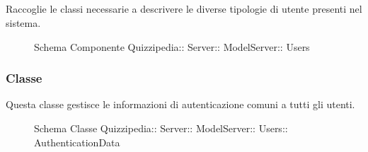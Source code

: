 \subsection{}
Raccoglie le classi necessarie a descrivere le diverse tipologie di utente presenti nel sistema.
\begin{figure}[H]
\centering
\noindent{}
\caption[Schema Componente Quizzipedia::Server::ModelServer::Users]{Schema Componente Quizzipedia:: Server:: ModelServer:: Users}
\end{figure}
\subsubsection{Classe }
Questa classe gestisce le informazioni di autenticazione comuni a tutti gli utenti.
\begin{figure}[H]
\centering
\noindent{}
\caption[Schema Classe AuthenticationData]{Schema Classe Quizzipedia:: Server:: ModelServer:: Users:: AuthenticationData}
\end{figure}
